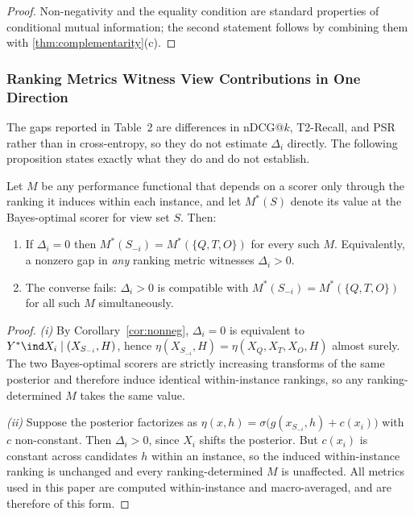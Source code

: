 \begin{proof}
Non-negativity and the equality condition are standard properties of conditional mutual information; the second statement follows by combining them with \cref{thm:complementarity}(c).
\end{proof}

\subsubsection{Ranking Metrics Witness View Contributions in One Direction}
\label{app:theory-metrics}

The gaps reported in Table~2 are differences in nDCG@$k$, T2-Recall, and PSR rather than in cross-entropy, so they do not estimate $\Delta_i$ directly. The following proposition states exactly what they do and do not establish.

\begin{proposition}
\label{prop:metric-witness}
Let $M$ be any performance functional that depends on a scorer only through the ranking it induces within each instance, and let $M^\ast(S)$ denote its value at the Bayes-optimal scorer for view set $S$. Then:
\begin{enumerate}
  \item[\textup{(i)}] If $\Delta_i = 0$ then $M^\ast(S_{-i}) = M^\ast(\{Q,T,O\})$ for every such $M$. Equivalently, a nonzero gap in \emph{any} ranking metric witnesses $\Delta_i > 0$.
  \item[\textup{(ii)}] The converse fails: $\Delta_i > 0$ is compatible with $M^\ast(S_{-i}) = M^\ast(\{Q,T,O\})$ for all such $M$ simultaneously.
\end{enumerate}
\end{proposition}

\begin{proof}
\emph{(i)} By Corollary~\ref{cor:nonneg}, $\Delta_i = 0$ is equivalent to $Y^\ast \ind X_i \mid (X_{S_{-i}}, H)$, hence $\eta(X_{S_{-i}}, H) = \eta(X_Q, X_T, X_O, H)$ almost surely. The two Bayes-optimal scorers are strictly increasing transforms of the same posterior and therefore induce identical within-instance rankings, so any ranking-determined $M$ takes the same value.

\emph{(ii)} Suppose the posterior factorizes as $\eta(x, h) = \sigma\big(g(x_{S_{-i}}, h) + c(x_i)\big)$ with $c$ non-constant. Then $\Delta_i > 0$, since $X_i$ shifts the posterior. But $c(x_i)$ is constant across candidates $h$ within an instance, so the induced within-instance ranking is unchanged and every ranking-determined $M$ is unaffected. All metrics used in this paper are computed within-instance and macro-averaged, and are therefore of this form.
\end{proof}

